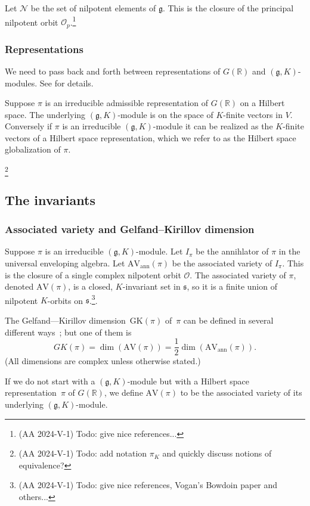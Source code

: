 \documentclass[10pt,leqno]{article}
\renewcommand{\O}{\mathcal O}
\newcommand{\R}{\mathbb R}
\newcommand{\N}{\mathcal N}
\newcommand{\g}{\mathfrak g}
\newcommand{\s}{\mathfrak s}
\newcommand{\AV}{\mathrm{AV}}
\newcommand{\AVann}{\mathrm{AV}_{\mathrm{ann}}}
\newcommand{\GK}{\mathrm{GK}}
\newcommand{\Op}{\O_p}
\begin{document}
Let $\N$ be the set of nilpotent elements of $\g$.
This is the closure of the principal nilpotent orbit $\Op$.\footnote{(AA 2024-V-1) Todo: give nice references...}

\subsubsection*{Representations} 

We need to pass back and forth between representations of $G(\R)$ and $(\g,K)$-modules.
See \cite{greenbook} for details.

Suppose $\pi$ is an irreducible admissible representation of $G(\R)$  on a Hilbert space. 
The underlying
$(\g,K)$-module is on the space of $K$-finite vectors in
$V$. Conversely if $\pi$ is an irreducible $(\g,K)$-module it can be
realized as the $K$-finite vectors of a Hilbert space representation, which we
refer to as the Hilbert space globalization of $\pi$.

\footnote{(AA 2024-V-1) Todo: add notation $\pi_K$ and quickly discuss notions of equivalence?}

\subsection{The invariants}\label{sec:invariants}


\subsubsection*{Associated variety and Gelfand--Kirillov dimension}


Suppose $\pi$ is an irreducible $(\g,K)$-module.
Let $I_\pi$ be the annihlator of $\pi$ in the universal enveloping algebra.
Let $\AVann(\pi)$ be the associated variety of $I_\pi$.
This is the closure of a single complex nilpotent orbit $\O$.
The associated variety of $\pi$, denoted $\AV(\pi)$, is a closed, $K$-invariant set in $\s$, so it is a finite union of
nilpotent $K$-orbits on $\s$.\footnote{(AA 2024-V-1) Todo: give nice references, Vogan's Bowdoin paper and others...}.





The Gelfand---Kirillov dimension~$\GK(\pi)$ of~$\pi$ can be defined in several different ways~\cite{vogan-gelfand-kirillov}; but one of them is
$$
GK(\pi)=\dim(\AV(\pi))=\frac12\dim(\AVann(\pi)).
$$
(All dimensions are complex unless otherwise stated.)


If we do not start with a $(\g, K)$-module but with a Hilbert space representation~$\pi$ of $G(\R)$,  we define $\AV(\pi)$ to be the associated variety 
of its underlying $(\g,K)$-module.
\end{document}
